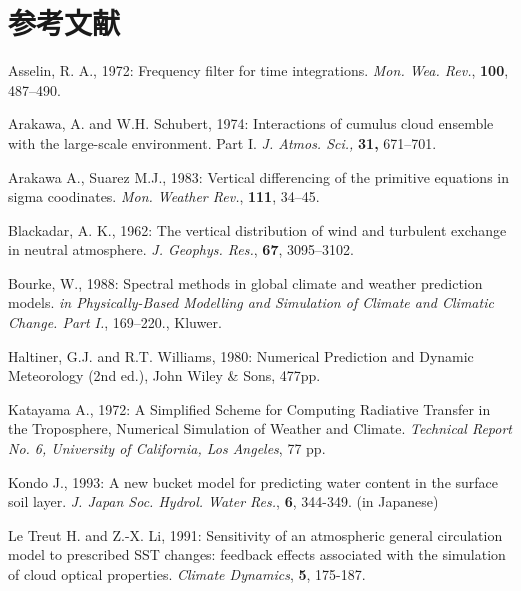 ﻿
\section*{参考文献}

\begin{description}

\item Asselin, R. A., 1972:
      Frequency filter for time integrations.
      {\it Mon. Wea. Rev.}, {\bf 100}, 487–490.

\item Arakawa, A. and W.H. Schubert, 1974:
      Interactions of cumulus cloud ensemble with the large-scale
      environment. Part I. {\em J. Atmos. Sci.,\/} {\bf 31,} 671--701.

\item Arakawa A., Suarez M.J., 1983:
      Vertical differencing of the primitive equations
      in sigma coodinates.
      {\it Mon. Weather Rev.}, {\bf 111}, 34--45.

\item Blackadar, A. K., 1962:
      The vertical distribution of wind and turbulent exchange in neutral atmosphere.
      {\it J. Geophys. Res.}, {\bf 67}, 3095–3102.

\item Bourke, W., 1988:
      Spectral methods in global climate and weather prediction models.
      {\it  in Physically-Based Modelling and Simulation of Climate
              and Climatic Change. Part I.}, 169--220., Kluwer.

\item Haltiner, G.J. and R.T. Williams,  1980:
      Numerical Prediction and Dynamic Meteorology (2nd ed.),
      John Wiley \& Sons, 477pp.

\item Katayama A., 1972:
      A Simplified Scheme for Computing Radiative Transfer
      in the Troposphere, Numerical Simulation of Weather and Climate.
      {\it Technical Report No. 6, University of California, Los Angeles}, 77 pp.

\item Kondo J., 1993:
      A new bucket model for predicting water content
      in the surface soil layer.
      {\it J. Japan Soc. Hydrol. Water Res.}, {\bf 6}, 344-349. (in Japanese)

\item Le Treut H. and Z.-X. Li, 1991:
      Sensitivity of an atmospheric general circulation model to
      prescribed SST changes: feedback effects associated with the
      simulation of cloud optical properties.
      {\it Climate Dynamics}, {\bf 5}, 175-187.


\end{description}
